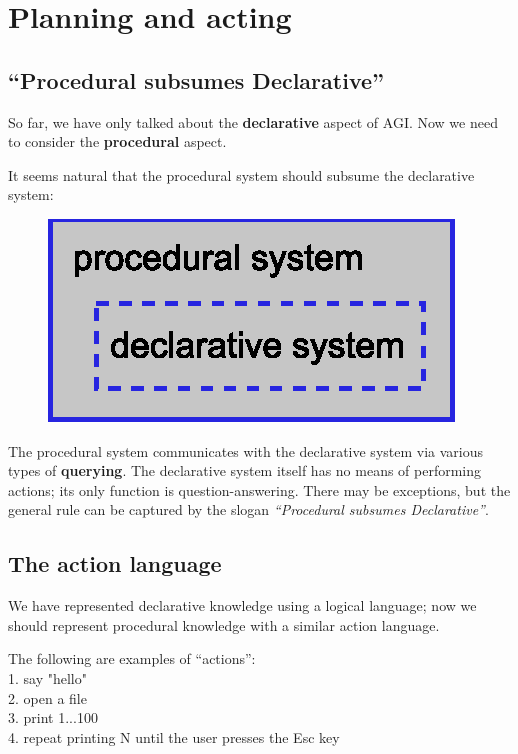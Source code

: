 \chapter{Planning and acting}
\label{ch:planning-acting}
\minitoc

\section{``Procedural subsumes Declarative''}
\label{sec:proc-subsumes-decl}

So far, we have only talked about the \textbf{declarative} aspect of AGI.  Now we need to consider the \textbf{procedural} aspect.

It seems natural that the procedural system should subsume the declarative system:
\begin{figure}[H]
\centering
\includegraphics{Procedural-subsumes-Declarative-system.eps}
\end{figure}
\vspace{-0.5cm}

The procedural system communicates with the declarative system via various types of \textbf{querying}.  The declarative system itself has no means of performing actions;  its only function is question-answering.  There may be exceptions, but the general rule can be captured by the slogan \textit{``Procedural subsumes Declarative''}.

\section{The action language}
\label{sec:ActionLanguage}

We have represented declarative knowledge using a logical language; now we should represent procedural knowledge with a similar action language.

The following are examples of ``actions'':\\
1. say "hello"\\
2. open a file\\
3. print 1...100\\
4. repeat printing N until the user presses the Esc key


